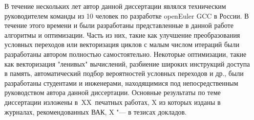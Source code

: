 {\contribution} В течение нескольких лет автор данной диссертации являлся техническим руководителем команды из 10 человек по разработке openEuler GCC в России. В течение этого времени и были разработаны представленные в данной работе алгоритмы и оптимизации. Часть из них, такие как  улучшение преобразования условных переходов или векторизация циклов с малым числом итераций  были разработаны автором полностью самостоятельно. Некоторые оптимизации, такие как векторизация "ленивых"\phantom{ } вычислений, разбиение широких инструкций доступа в память, автоматический подбор вероятностей условных переходов и др., были разработаны студентами и инженерами, находящимися под непосредственным руководством автора данной диссертации. 
{%
    {\publications} Основные результаты по теме диссертации изложены
    в~XX~печатных работах,
    X из которых изданы в журналах, рекомендованных ВАК,
    X "--- в тезисах докладов.
}%

